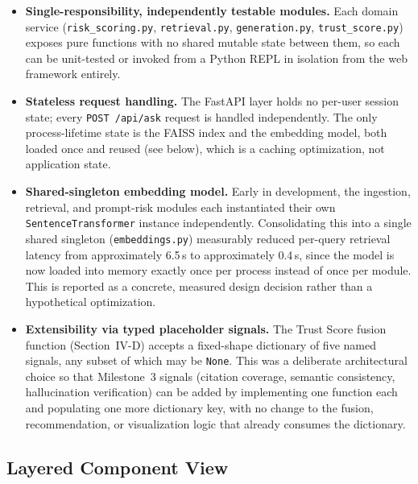 \documentclass[conference]{IEEEtran}
\begin{document}
\begin{itemize}
  \item \textbf{Single-responsibility, independently testable modules.} Each domain
  service (\texttt{risk\_scoring.py}, \texttt{retrieval.py}, \texttt{generation.py},
  \texttt{trust\_score.py}) exposes pure functions with no shared mutable state between
  them, so each can be unit-tested or invoked from a Python REPL in isolation from the
  web framework entirely.
  \item \textbf{Stateless request handling.} The FastAPI layer holds no per-user session
  state; every \texttt{POST /api/ask} request is handled independently. The only
  process-lifetime state is the FAISS index and the embedding model, both loaded once
  and reused (see below), which is a caching optimization, not application state.
  \item \textbf{Shared-singleton embedding model.} Early in development, the ingestion,
  retrieval, and prompt-risk modules each instantiated their own
  \texttt{SentenceTransformer} instance independently. Consolidating this into a single
  shared singleton (\texttt{embeddings.py}) measurably reduced per-query retrieval
  latency from approximately 6.5\,s to approximately 0.4\,s, since the model is now
  loaded into memory exactly once per process instead of once per module. This is
  reported as a concrete, measured design decision rather than a hypothetical
  optimization.
  \item \textbf{Extensibility via typed placeholder signals.} The Trust Score fusion
  function (Section~IV-D) accepts a fixed-shape dictionary of five named signals, any
  subset of which may be \texttt{None}. This was a deliberate architectural choice so
  that Milestone~3 signals (citation coverage, semantic consistency, hallucination
  verification) can be added by implementing one function each and populating one more
  dictionary key, with no change to the fusion, recommendation, or visualization logic
  that already consumes the dictionary.
\end{itemize}

\subsection{Layered Component View}
\end{document}
